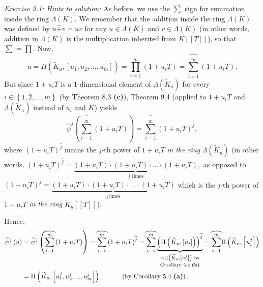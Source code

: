 \documentclass[numbers=enddot,12pt,final,onecolumn,notitlepage]{scrartcl}%
\begin{document}
\textit{Exercise 9.1: Hints to solution:} As before, we use the $\widehat{\sum
}$ sign for summation inside the ring $\Lambda\left(  K\right)  $. We remember
that the addition inside the ring $\Lambda\left(  K\right)  $ was defined by
$u\widehat{+}v=uv$ for any $u\in\Lambda\left(  K\right)  $ and $v\in
\Lambda\left(  K\right)  $ (in other words, addition in $\Lambda\left(
K\right)  $ is the multiplication inherited from $K\left[  \left[  T\right]
\right]  $), so that $\widehat{\sum}=\prod.$ Now,
\[
u=\Pi\left(  \widetilde{K}_{u},\left[  u_{1},u_{2},...,u_{m}\right]  \right)
=\prod_{i=1}^{m}\left(  1+u_{i}T\right)  =\widehat{\sum_{i=1}^{m}}\left(
1+u_{i}T\right)  .
\]
But since $1+u_{i}T$ is a $1$-dimensional element of $\Lambda\left(
\widetilde{K}_{u}\right)  $ for every $i\in\left\{  1,2,...,m\right\}  $ (by
Theorem 8.3 \textbf{(c)}), Theorem 9.4 (applied to $1+u_{i}T$ and
$\Lambda\left(  \widetilde{K}_{u}\right)  $ instead of $u_{i}$ and $K$) yields%
\[
\widehat{\psi}^{j}\left(  \widehat{\sum_{i=1}^{m}}\left(  1+u_{i}T\right)
\right)  =\widehat{\sum_{i=1}^{m}}\left(  1+u_{i}T\right)  ^{\widehat{j}},
\]
where $\left(  1+u_{i}T\right)  ^{\widehat{j}}$ means the $j$-th power of
$1+u_{i}T$ \textit{in the ring }$\Lambda\left(  \widetilde{K}_{u}\right)  $
(in other words, $\left(  1+u_{i}T\right)  ^{\widehat{j}}=\underbrace{\left(
1+u_{i}T\right)  \widehat{\cdot}\left(  1+u_{i}T\right)  \widehat{\cdot
}...\widehat{\cdot}\left(  1+u_{i}T\right)  }_{j\text{ times}},$ as opposed to
\newline$\left(  1+u_{i}T\right)  ^{j}=\underbrace{\left(  1+u_{i}T\right)
\cdot\left(  1+u_{i}T\right)  \cdot...\cdot\left(  1+u_{i}T\right)  }_{j\text{
times}}$ which is the $j$-th power of $1+u_{i}T$ \textit{in the ring
}$\widetilde{K}_{u}\left[  \left[  T\right]  \right]  $).

Hence,%
\begin{align*}
\widehat{\psi}^{j}\left(  u\right)   &  =\widehat{\psi}^{j}\left(
\widehat{\sum_{i=1}^{m}}\left(  1+u_{i}T\right)  \right)  =\widehat{\sum
_{i=1}^{m}}\left(  1+u_{i}T\right)  ^{\widehat{j}}=\widehat{\sum_{i=1}^{m}%
}\underbrace{\left(  \Pi\left(  \widetilde{K}_{u},\left[  u_{i}\right]
\right)  \right)  ^{\widehat{j}}}_{\substack{=\Pi\left(  \widetilde{K}%
_{u},\left[  u_{i}^{j}\right]  \right)  \text{ by}\\\text{Corollary 5.4
\textbf{(b)}}}}=\widehat{\sum_{i=1}^{m}}\Pi\left(  \widetilde{K}_{u},\left[
u_{i}^{j}\right]  \right) \\
&  =\Pi\left(  \widetilde{K}_{u},\left[  u_{1}^{j},u_{2}^{j},...,u_{m}%
^{j}\right]  \right)  \ \ \ \ \ \ \ \ \ \ \left(  \text{by Corollary 5.4
\textbf{(a)}}\right)  .
\end{align*}
\end{document}
